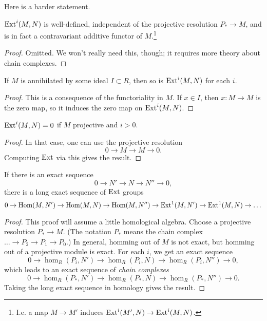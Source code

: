 Here is a harder statement.
\begin{proposition} 
$\mathrm{Ext}^i(M,N)$ is well-defined, independent of the projective
resolution $P_*
\to M$, and is in fact a contravariant additive functor of
$M$.\footnote{I.e. a map $M
\to M'$ induces $\mathrm{Ext}^i(M', N) \to \mathrm{Ext}^i(M,N)$.}
\end{proposition} 
\begin{proof} 
Omitted. We won't really need this, though; it requires more
theory about
chain complexes.
\end{proof} 


\begin{proposition} 
If $M$ is annihilated by some ideal $I \subset R$, then so is
$\mathrm{Ext}^i(M,N)$ for
each $i$.
\end{proposition} 
\begin{proof} 
This is a consequence of the functoriality in $M$. If $x \in I$,
then $x: M \to
M$ is the zero map, so it induces the zero map on $\mathrm{Ext}^i(M,N)$.\end{proof} 

\begin{proposition} 
$\mathrm{Ext}^i(M,N) = 0$ if $M$ projective and $i>0$.
\end{proposition} 
\begin{proof} 
In that case, one can use the projective resolution
\[ 0 \to M \to M \to 0.  \]
Computing $\mathrm{Ext}$ via this gives the result.
\end{proof} 




\begin{proposition} 
If there is an exact sequence
\[ 0 \to N' \to N \to N'' \to 0,  \]
there is a long exact sequence of $\mathrm{Ext}$ groups
\[ 0 \to \operatorname{Hom}(M,N') \to \operatorname{Hom}(M,N) \to \operatorname{Hom}(M,N'') \to
\mathrm{Ext}^1(M,N') \to
\mathrm{Ext}^1(M,N) \to \dots  \]
\end{proposition} 
\begin{proof} 
This proof will assume a little homological algebra. Choose a
projective
resolution $P_* \to M$. (The notation $P_*$ means the chain
complex $\dots \to
P_2 \to P_1 \to P_0$.) In general, homming out of $M$ is not
exact, but homming
out of a projective module is exact. For each $i$, we get an
exact sequence
\[ 0 \to \hom_R(P_i, N') \to \hom_R(P_i, N) \to \hom_R(P_i, N'')
\to 0, \]
which leads to an exact sequence of \emph{chain complexes}
\[ 0 \to \hom_R(P_*,N') \to \hom_R(P_*,N) \to \hom_R(P_*,N'')
\to 0 . \]
Taking the long exact sequence in homology gives the result.
\end{proof} 


